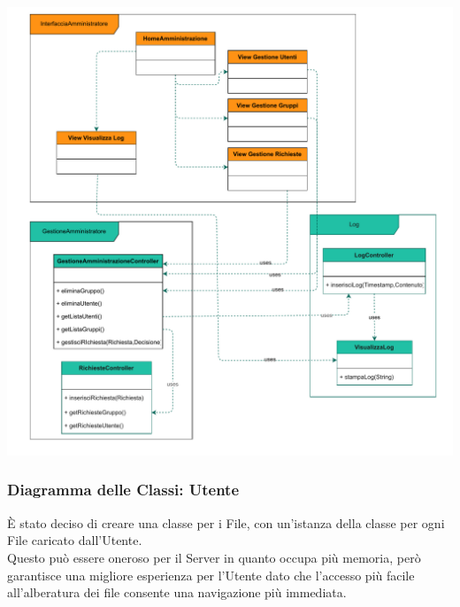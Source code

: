 \begin{adjustwidth}{-2.5cm}{0cm}
\includegraphics[scale=0.8]{classi/Package-Classi-Amministrazione.drawio.pdf}
\end{adjustwidth}
\pagebreak




\subsubsection*{Diagramma delle Classi: Utente}
\vspace{0.5cm}

È stato deciso di creare una classe per i File, con un'istanza della classe per ogni File caricato dall'Utente.\\
Questo può essere oneroso per il Server in quanto occupa più memoria, però garantisce una migliore esperienza per l'Utente dato che l'accesso più facile all'alberatura dei file consente una navigazione più immediata.\\

